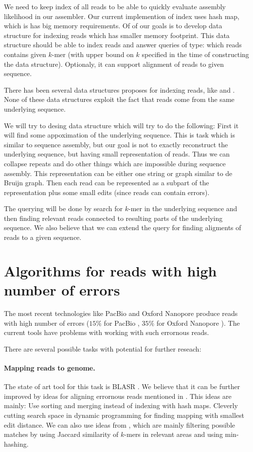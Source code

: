 We need to keep index of all reads to be
able to quickly evaluate assembly likelihood in our assembler.
Our current implemention of index uses hash map, which
is has big memory requirements.
Of of our goals is to develop data structure for indexing
reads which has smaller memory footprint.
This data structure should be able to index reads
and answer queries of type: which reads contains
given $k$-mer (with upper bound on $k$ specified in the time
of constructing the data structure). Optionaly,
it can support alignment of reads to given sequence.

There has been several data structures proposes for
indexing reads, like \cite{GKArrays} and \cite{CGKArrays}.
None of these data structures exploit the fact
that reads come from the same underlying sequence.

We will try to desing data structure which will try to do the following:
First it will find some appoximation of the underlying sequence.
This is task which is similar to sequence assembly, but our goal
is not to exactly reconstruct the underlying sequence, but having small
representation of reads. Thus we can collapse repeats and do other things
which are impossible during sequence assembly.
This representation can be either one string or graph similar to
de Bruijn graph. Then each read can be represented
as a subpart of the representation plus some small edits (since
reads can contain errors).

The querying will be done by search for $k$-mer in the underlying
sequence and then finding relevant reads connected to resulting
parts of the underlying sequence. We also believe
that we can extend the query for finding aligments of reads to a given sequence.

\section{Algorithms for reads with high number of errors}

The most recent technologies like PacBio and Oxford
Nanopore produce reads with high number of errors
($15\%$ for PacBio \cite{PacbioToCA}, $35\%$ for Oxford Nanopore \cite{oxford}).
The current tools have problems with working with such errornous reads.

There are several possible tasks with potential for further reseach:

\paragraph{Mapping reads to genome.} The state of art tool
for this task is BLASR \cite{BLASR}. We believe
that it can be further improved by ideas for aligning errornous reads
mentioned in \cite{myers2014efficient}. 
This ideas are mainly: Use sorting and merging instead of indexing with hash maps. 
Cleverly cutting search space in dynamic programming for finding mapping
with smallest edit distance.
We can also use ideas from \cite{MHAP}, which are mainly filtering
possible matches by using Jaccard similarity of $k$-mers in relevant areas
and using min-hashing.

